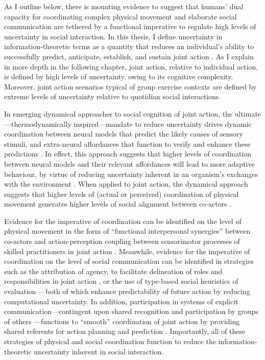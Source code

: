 \begin{CJK}{UTF8}{gbsn}
As I outline below, there is mounting evidence to suggest that humans' dual capacity for coordinating complex physical movement and elaborate social communication are tethered by a functional imperative to regulate high levels of uncertainty in social interaction.  In this thesis, I define uncertainty in information-theoretic terms as a quantity that reduces an individual's ability to successfully predict, anticipate, establish, and sustain joint action \citep{Shannon1963}.  As I explain in more depth in the following chapter, joint action, relative to individual action, is defined by high levels of uncertainty, owing to its cognitive complexity.  Moreover, joint action scenarios typical of group exercise contexts are defined by extreme levels of uncertainty relative to quotidian social interactions.

In emerging dynamical approaches to social cognition of joint action, the ultimate---thermodynamically inspired---mandate to reduce uncertainty drives dynamic coordination between neural models that predict the likely causes of sensory stimuli,  and extra-neural affordances that function to verify and enhance these predictions \citep{Friston2015,Ramstead2016}.  In effect, this approach suggests that higher levels of coordination between neural models and their relevant affordances will lead to more adaptive behaviour, by virtue of reducing uncertainty inherent in an organism's exchanges with the environment \citep{Friston2010,Ramstead2017}.  When applied to joint action, the dynamical approach suggests that higher levels of (actual or perceived) coordination of physical movement generates higher levels of social alignment between co-actors \citep[]{Semin2008,Wheatley2012}.

Evidence for the imperative of coordination can be identified on the level of physical movement in the form of ``functional interpersonal synergies'' \citep{Riley2011} between co-actors and action-perception coupling between sensorimotor processes of skilled practitioners in joint action \citep{Novembre2014}.  Meanwhile, evidence for the imperative of coordination on the level of social communication can be identified in strategies such as the attribution of agency, to facilitate delineation of roles and responsibilities in joint action \citep{Wolpert2003,Sato2008,VanderWel2012}, or the use of type-based social heuristics of evaluation \citep[e.g., personality type or social standing; see][]{Moutoussis2014}---both of which enhance predictability of future action by reducing computational uncertainty.
In addition, participation in systems of explicit communication---contingent upon shared recognition and participation by groups of others \citep{Ramstead2016}---functions to ``smooth'' coordination of joint action by providing shared referents for action planning and prediction \citep{Vesper2017}.
Importantly, all of these strategies of physical and social coordination function to reduce the information-theoretic uncertainty inherent in social interaction.


\end{CJK}
